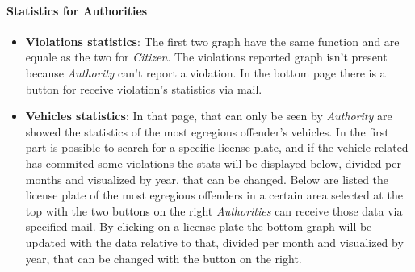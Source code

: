 \documentclass{article}
\begin{document}
\clearpage

\paragraph{Statistics for Authorities}
\begin{itemize}
    \item \textbf{Violations statistics}: The first two graph have the same function and are equale as the 
    two for \textit{Citizen}. The violations reported graph isn't present because \textit{Authority} can't 
    report a violation. In the bottom page there is a button for receive violation's statistics via mail.
    \item \textbf{Vehicles statistics}: In that page, that can only be seen by \textit{Authority} are showed 
    the statistics of the most egregious offender's vehicles. In the first part is possible to search for a 
    specific license plate, and if the vehicle related has commited some violations the stats will be displayed 
    below, divided per months and visualized by year, that can be changed.  Below are listed the license plate 
    of the most egregious offenders in a certain area selected at the top with the two buttons on the 
    right \textit{Authorities} can receive those data via specified mail. By clicking on a license plate 
    the bottom graph will be updated with the data relative to that, divided per month and visualized by year, 
    that can be changed with the button on the right.
\end{itemize}
\end{document}
